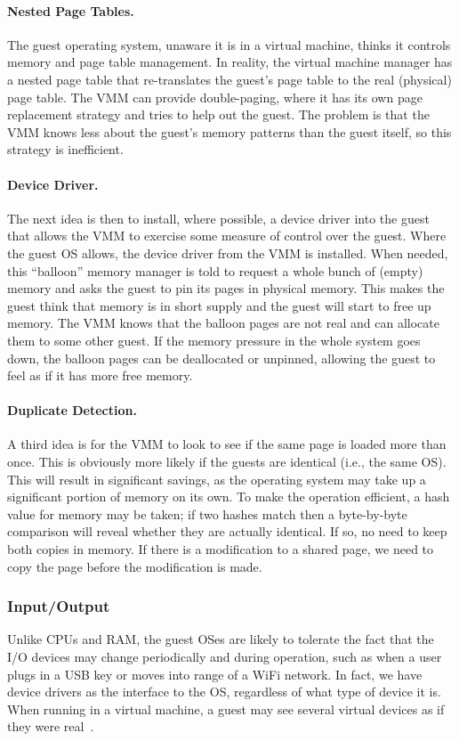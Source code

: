 \paragraph{Nested Page Tables.} The guest operating system, unaware it is in a virtual machine, thinks it controls memory and page table management. In reality, the virtual machine manager has a nested page table that re-translates the guest's page  table to the real (physical) page table. The VMM can provide double-paging, where it has its own page replacement strategy and tries to help out the guest. The problem is that the VMM knows less about the guest's memory patterns than the guest itself, so this strategy is inefficient.

\paragraph{Device Driver.} The next idea is then to install, where possible, a device driver into the guest that allows the VMM to exercise some measure of control over the guest. Where the guest OS allows, the device driver from the VMM is installed. When needed, this ``balloon'' memory manager is told to request a whole bunch of (empty) memory and asks the guest to pin its pages in physical memory. This makes the guest think that memory is in short supply and the guest will start to free up memory. The VMM knows that the balloon pages are not real and can allocate them to some other guest. If the memory pressure in the whole system goes down, the balloon pages can be deallocated or unpinned, allowing the guest to feel as if it has more free memory.

\paragraph{Duplicate Detection.} A third idea is for the VMM to look to see if the same page is loaded more than once. This is obviously more likely if the guests are identical (i.e., the same OS). This will result in significant savings, as the operating system may take up a significant portion of memory on its own. To make the operation efficient, a hash value for memory may be taken; if two hashes match then a byte-by-byte comparison will reveal whether they are actually identical. If so, no need to keep both copies in memory. If there is a modification to a shared page, we need to copy the page before the modification is made.

\subsubsection*{Input/Output}
Unlike CPUs and RAM, the guest OSes are likely to tolerate the fact that the I/O devices may change periodically and during operation, such as when a user plugs in a USB key or moves into range of a WiFi network. In fact, we have device drivers as the interface to the OS, regardless of what type of device it is. When running in a virtual machine, a guest may see several virtual devices as if they were real~\cite{osc}.

